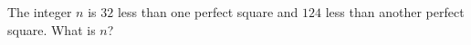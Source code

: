 The integer $n$ is $32$ less than one perfect square and $124$ less than another perfect square. What is $n$?
